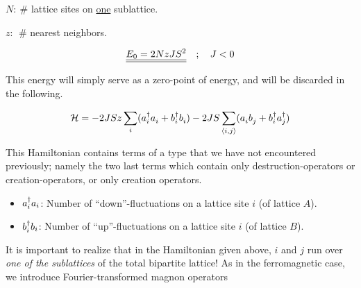 \begin{description}
	\item $N: \ \#$ lattice sites on \uline{one} sublattice.
	\item $z:\ \ \#$ nearest neighbors.
\end{description}

\begin{equation}
	\uline{\uline{E_0 = 2NzJS^2}} \quad ; \quad J < 0
\end{equation}

This energy will simply serve as a zero-point of energy, and will be discarded in the following.

\begin{tcolorbox}
	\begin{equation}
		\mathcal{H} = -2JSz\sum_i (a_i^\dagger a_i^{} + b_i^\dagger b_i^{}) - 2JS \sum_{\langle i, j \rangle} (a_i^{} b_j^{} + b_i^\dagger a_j^\dagger)
	\end{equation}
\end{tcolorbox}

This Hamiltonian contains terms of a type that we have not encountered previously; namely the two last terms which contain only destruction-operators or creation-operators,
or only creation operators. 

\begin{itemize}
	\item $a^{\dagger}_i a_i$: Number of ``down''-fluctuations on a lattice site $i$ (of lattice $A$).
	\item $b^{\dagger}_i b_i$: Number of ``up''-fluctuations on a lattice site $i$ (of lattice $B$).
\end{itemize}
It is important to realize that in the Hamiltonian given above, $i$ and $j$ run over \emph{one of the sublattices} of the total bipartite lattice!
As in the ferromagnetic case, we introduce Fourier-transformed magnon operators

